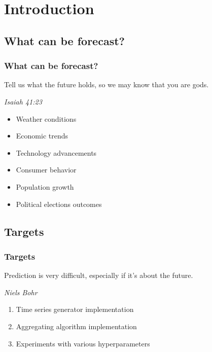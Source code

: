 \section{Introduction} %
\subsection{What can be forecast?} 

\begin{frame}
\frametitle{What can be forecast?}

\epigraph{Tell us what the future holds, so we may know that you are gods.}{\textit{Isaiah 41:23}}
%
\begin{itemize}
\item Weather conditions
\item Economic trends
\item Technology advancements
\item Consumer behavior
\item Population growth
\item Political elections outcomes

\end{itemize}
\end{frame}

\subsection{Targets} 

\begin{frame}
\frametitle{Targets}
\setlength{}
\epigraph{Prediction is very difficult, especially if it's about the future.}{\textit{Niels Bohr}}

\begin{enumerate}
\item Time series generator implementation
\item Aggregating algorithm implementation
\item Experiments with various hyperparameters    
\end{enumerate}


\end{frame}

